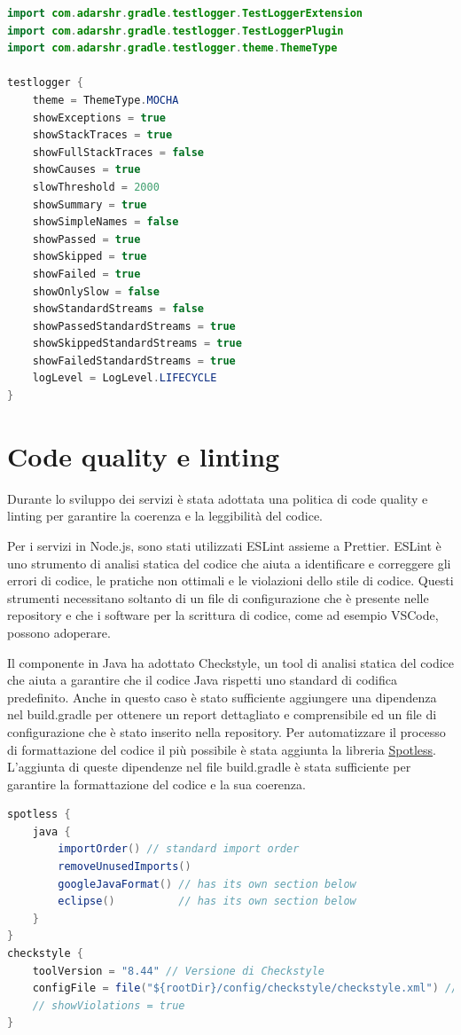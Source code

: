 \begin{lstlisting}[language=Java, caption={Test logger}, label=list:gradle_testlogger]
import com.adarshr.gradle.testlogger.TestLoggerExtension
import com.adarshr.gradle.testlogger.TestLoggerPlugin
import com.adarshr.gradle.testlogger.theme.ThemeType

testlogger {
    theme = ThemeType.MOCHA
    showExceptions = true
    showStackTraces = true
    showFullStackTraces = false
    showCauses = true
    slowThreshold = 2000
    showSummary = true
    showSimpleNames = false
    showPassed = true
    showSkipped = true
    showFailed = true
    showOnlySlow = false
    showStandardStreams = false
    showPassedStandardStreams = true
    showSkippedStandardStreams = true
    showFailedStandardStreams = true
    logLevel = LogLevel.LIFECYCLE
}
\end{lstlisting}

\section{Code quality e linting} 
\label{code_quality}

Durante lo sviluppo dei servizi è stata adottata una politica di code quality e linting per garantire la coerenza e la leggibilità del codice.

Per i servizi in Node.js, sono stati utilizzati ESLint assieme a Prettier. ESLint è uno strumento di analisi statica del codice che aiuta a identificare e correggere gli errori di codice, le pratiche non ottimali e le violazioni dello stile di codice.
Questi strumenti necessitano soltanto di un file di configurazione che è presente nelle repository e che i software per la scrittura di codice, come ad esempio VSCode, possono adoperare.

Il componente in Java ha adottato Checkstyle, un tool di analisi statica del codice che aiuta a garantire che il codice Java rispetti uno standard di codifica predefinito. Anche in questo caso è stato sufficiente aggiungere una dipendenza nel build.gradle per ottenere un report dettagliato e comprensibile ed un file di configurazione che è stato inserito nella repository. Per automatizzare il processo di formattazione del codice il più possibile è stata aggiunta la libreria \href{https://github.com/diffplug/spotless}{\underline{Spotless}}. L'aggiunta di queste dipendenze nel file build.gradle è stata sufficiente per garantire la formattazione del codice e la sua coerenza.

\begin{lstlisting}[language=Java, caption={Code quality}, label=list:gradle_codequality]
spotless {
    java {
        importOrder() // standard import order
        removeUnusedImports()
        googleJavaFormat() // has its own section below
        eclipse()          // has its own section below
    }
}
checkstyle {
    toolVersion = "8.44" // Versione di Checkstyle
    configFile = file("${rootDir}/config/checkstyle/checkstyle.xml") // Configurazione di Checkstyle
    // showViolations = true
}
\end{lstlisting}


